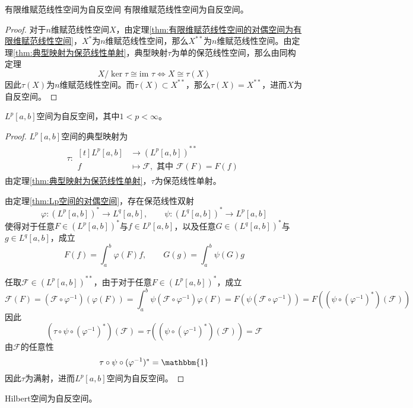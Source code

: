 \documentclass[lang = cn, scheme = chinese, thmcnt = section]{elegantbook}
\newcommand{\sub}{\subset}             %
\newcommand{\im}{\text{im }}           %
\begin{document}
\begin{theorem}{}{有限维赋范线性空间为自反空间}
	有限维赋范线性空间为自反空间。
\end{theorem}

\begin{proof}
	对于$n$维赋范线性空间$X$，由定理\ref{thm:有限维赋范线性空间的对偶空间为有限维赋范线性空间}，$X^*$为$n$维赋范线性空间，那么$X^{**}$为$n$维赋范线性空间。由定理\ref{thm:典型映射为保范线性单射}，典型映射$\tau$为单的保范线性空间，那么由同构定理
	$$
	X/\ker\tau\cong\im\tau\iff X\cong \tau(X)
	$$
	因此$\tau(X)$为$n$维赋范线性空间。而$\tau(X)\sub X^{**}$，那么$\tau(X)=X^{**}$，进而$X$为自反空间。
\end{proof}

\begin{theorem}
	$L^p[a,b]$空间为自反空间，其中$1<p<\infty$。
\end{theorem}

\begin{proof}
	$L^p[a,b]$空间的典型映射为
	\begin{align*}
		\tau:\begin{aligned}[t]
			L^p[a,b]&\longrightarrow (L^p[a,b])^{**}\\
			f&\longmapsto \mathscr{F},\text{ 其中 }\mathscr{F}(F)=F(f)
		\end{aligned}
	\end{align*}
	由定理\ref{thm:典型映射为保范线性单射}，$\tau$为保范线性单射。
	
	由定理\ref{thm:Lp空间的对偶空间}，存在保范线性双射
	$$
	\varphi:(L^p[a,b])^*\longrightarrow L^q[a,b] ,\qquad 
	\psi:(L^q[a,b])^*\longrightarrow L^p[a,b]
	$$
	使得对于任意$F\in (L^p[a,b])^*$与$f\in L^p[a,b]$，以及任意$G\in (L^q[a,b])^*$与$g\in L^q[a,b]$，成立
	$$
	F(f)=\int_a^b \varphi(F)f,\qquad 
	G(g)=\int_a^b \psi(G)g
	$$
	
	任取$\mathscr{F}\in (L^p[a,b])^{**}$，由于对于任意$F\in (L^p[a,b])^*$，成立
	$$
	\mathscr{F}(F)
	=(\mathscr{F}\circ \varphi^{-1})(\varphi(F))
	=\int_a^b  \psi(\mathscr{F}\circ \varphi^{-1})\varphi(F)
	=F(\psi(\mathscr{F}\circ \varphi^{-1}))
	=F((\psi\circ (\varphi^{-1})^*)(\mathscr{F}))
	$$
	因此
	$$
	(\tau\circ \psi \circ (\varphi^{-1})^*)(\mathscr{F})=
	\tau((\psi\circ (\varphi^{-1})^*)(\mathscr{F}))
	=\mathscr{F}
	$$
	由$\mathscr{F}$的任意性
	$$
	\tau\circ \psi \circ (\varphi^{-1})^*=\mathbbm{1}
	$$
	因此$\tau$为满射，进而$L^p[a,b]$空间为自反空间。
\end{proof}

\begin{theorem}
	Hilbert空间为自反空间。
\end{theorem}
\end{document}
